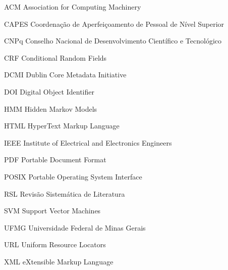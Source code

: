 
\begin{siglas}
  \item[ACM] Association for Computing Machinery
  \item[CAPES] Coordenação de Aperfeiçoamento de Pessoal de Nível Superior
  \item[CNPq] Conselho Nacional de Desenvolvimento Científico e Tecnológico
  \item[CRF] Conditional Random Fields
  \item[DCMI] Dublin Core Metadata Initiative
  \item[DOI] Digital Object Identifier
  \item[HMM] Hidden Markov Models
  \item[HTML] HyperText Markup Language
  \item[IEEE] Institute of Electrical and Electronics Engineers
  \item[PDF] Portable Document Format
  \item[POSIX] Portable Operating System Interface
  \item[RSL] Revisão Sistemática de Literatura
  \item[SVM] Support Vector Machines
  \item[UFMG] Universidade Federal de Minas Gerais
  \item[URL] Uniform Resource Locators
  \item[XML] eXtensible Markup Language
\end{siglas}